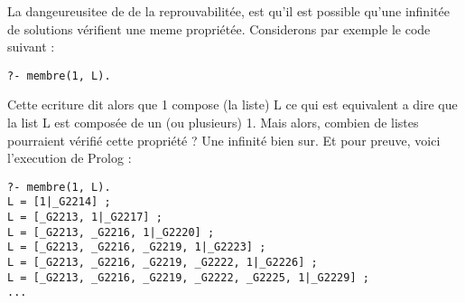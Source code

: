 La dangeureusitee de de la reprouvabilitée, est qu'il est possible qu'une
infinitée de solutions vérifient une meme propriétée. Considerons par exemple
le code suivant :

\begin{lstlisting}
?- membre(1, L).
\end{lstlisting}

Cette ecriture dit alors que 1 compose (la liste) L ce qui est equivalent a dire
que la list L est composée de un (ou plusieurs) 1. Mais alors, combien de listes
pourraient vérifié cette propriété ? Une infinité bien sur. Et pour preuve,
voici l'execution de Prolog :

\begin{lstlisting}
?- membre(1, L).
L = [1|_G2214] ;
L = [_G2213, 1|_G2217] ;
L = [_G2213, _G2216, 1|_G2220] ;
L = [_G2213, _G2216, _G2219, 1|_G2223] ;
L = [_G2213, _G2216, _G2219, _G2222, 1|_G2226] ;
L = [_G2213, _G2216, _G2219, _G2222, _G2225, 1|_G2229] ;
...
\end{lstlisting}
